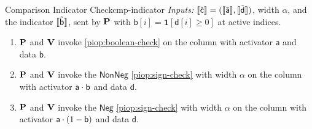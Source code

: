 \begin{DefinePIOP}{Comparison Indicator Check}{cmp-indicator}
  \emph{Inputs:} $\llbracket\hat{\mathsf{c}}\rrbracket = (\llbracket\tilde{\mathsf{a}}\rrbracket, \llbracket\tilde{\mathsf{d}}\rrbracket)$, width $\alpha$, and the indicator $\llbracket\tilde{\mathsf{b}}\rrbracket$, sent by $\bf{P}$ with $\mathsf{b}[i] = \mathbf{1}[\mathsf{d}[i] \ge 0]$ at active indices.
  \begin{enumerate}[nosep]
    \item $\bf{P}$ and $\bf{V}$ invoke \cref{piop:boolean-check} on the column with activator $\mathsf{a}$ and data $\mathsf{b}$.
    \item $\bf{P}$ and $\bf{V}$ invoke the $\mathsf{NonNeg}$ \cref{piop:sign-check} with width $\alpha$ on the column with activator $\mathsf{a}\cdot\mathsf{b}$ and data $\mathsf{d}$.
    \item $\bf{P}$ and $\bf{V}$ invoke the $\mathsf{Neg}$ \cref{piop:sign-check} with width $\alpha$ on the column with activator $\mathsf{a}\cdot(1-\mathsf{b})$ and data $\mathsf{d}$.
  \end{enumerate}
\end{DefinePIOP}

